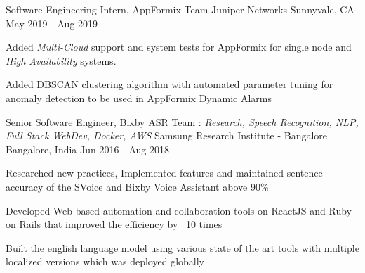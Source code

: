 

\begin{cventries}

    \cventry
      {Software Engineering Intern, AppFormix Team} %
      {Juniper Networks} %
      {Sunnyvale, CA} %
      {May 2019 - Aug 2019} %
      {
        \begin{cvitems}
        \item{Added \textit{Multi-Cloud} support and system tests for AppFormix for single node and \textit{High Availability} systems.}
        \item{Added DBSCAN clustering algorithm with automated parameter tuning for anomaly detection to be used in AppFormix Dynamic Alarms}
        \end{cvitems}
      }

  \cventry
    {Senior Software Engineer, Bixby ASR Team : \textit{Research, Speech Recognition, NLP, Full Stack WebDev, Docker, AWS}} %
    {Samsung Research Institute - Bangalore} %
    {Bangalore, India} %
    {Jun 2016 - Aug 2018} %
    {
      \begin{cvitems}
      \item{Researched new practices, Implemented features and maintained sentence accuracy of the SVoice and Bixby Voice Assistant above 90\%}
      \item{Developed Web based automation and collaboration tools on ReactJS and Ruby on Rails that improved the efficiency by ~10 times}
      \item{Built the english language model using various state of the art tools with multiple localized versions which was deployed globally}
      \end{cvitems}
    }


\end{cventries}
